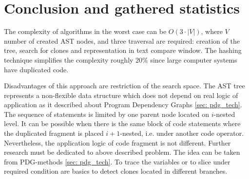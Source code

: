 \documentclass{report}
\begin{document}
\section{Conclusion and gathered statistics}
The complexity of algorithms in the worst case can be $O(3\cdot|V|)$, where $V$ number of created AST nodes, and three traversal are required: creation of the tree, search for clones and representation in text compare window. The hashing technique simplifies the complexity roughly 20\% since large computer systems have duplicated code.

Disadvantages of this approach are restriction of the search space. The AST tree represents a non-flexible data structure which does not depend on real logic of application as it described about Program Dependency Graphs \ref{sec: pdg_tech}. The sequence of statements is limited by one parent node located on $i$-nested level. It can be possible when there is the same block of code statements where the duplicated fragment is placed $i+1$-nested, i.e. under another code operator. Nevertheless, the application logic  of code fragment is not different. Further research must be dedicated to above described problem. The idea can be taken from PDG-methods \ref{sec: pdg_tech}. To trace the variables or to slice under required condition are basics to detect clones located in different branches.
\end{document}
